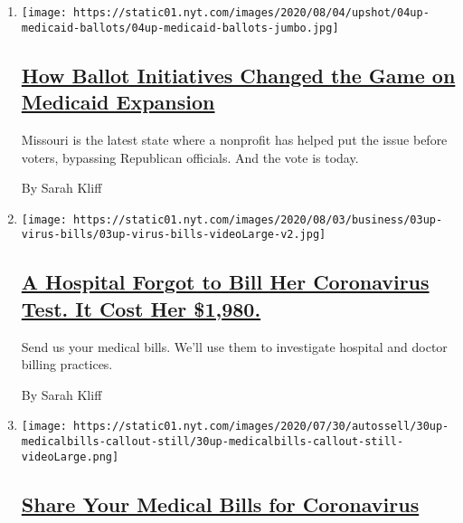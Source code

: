 \begin{enumerate}
\def\labelenumi{\arabic{enumi}.}
\item
  \texttt{[image: https://static01.nyt.com/images/2020/08/04/upshot/04up-medicaid-ballots/04up-medicaid-ballots-jumbo.jpg]}

  \hypertarget{how-ballot-initiatives-changed-the-game-on-medicaid-expansion}{%
  \subsection{\texorpdfstring{\href{/2020/08/04/upshot/missouri-election-medicaid-expansion.html}{How
  Ballot Initiatives Changed the Game on Medicaid
  Expansion}}{How Ballot Initiatives Changed the Game on Medicaid Expansion}}\label{how-ballot-initiatives-changed-the-game-on-medicaid-expansion}}

  Missouri is the latest state where a nonprofit has helped put the
  issue before voters, bypassing Republican officials. And the vote is
  today.

  By Sarah Kliff
\item
  \texttt{[image: https://static01.nyt.com/images/2020/08/03/business/03up-virus-bills/03up-virus-bills-videoLarge-v2.jpg]}

  \hypertarget{a-hospital-forgot-to-bill-her-coronavirus-test-it-cost-her-1980}{%
  \subsection{\texorpdfstring{\href{/2020/08/03/upshot/nj-coronavirus-medical-bill.html}{A
  Hospital Forgot to Bill Her Coronavirus Test. It Cost Her
  \$1,980.}}{A Hospital Forgot to Bill Her Coronavirus Test. It Cost Her \$1,980.}}\label{a-hospital-forgot-to-bill-her-coronavirus-test-it-cost-her-1980}}

  Send us your medical bills. We'll use them to investigate hospital and
  doctor billing practices.

  By Sarah Kliff
\item
  \texttt{[image: https://static01.nyt.com/images/2020/07/30/autossell/30up-medicalbills-callout-still/30up-medicalbills-callout-still-videoLarge.png]}

  \hypertarget{share-your-medical-bills-for-coronavirus}{%
  \subsection{\texorpdfstring{\href{/2020/08/03/reader-center/coronavirus-medical-bills.html}{Share
  Your Medical Bills for
  Coronavirus}}{Share Your Medical Bills for Coronavirus}}\label{share-your-medical-bills-for-coronavirus}}


\end{enumerate}
